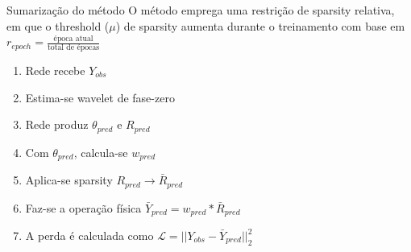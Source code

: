 \begin{frame}{Sumarização do método}
    O método emprega uma restrição de sparsity relativa, 
    em que o threshold ($\mu$) de sparsity aumenta durante o treinamento
    com base em $r_{epoch} = \frac{\text{época atual}}{\text{total de épocas}}$
    
    \begin{enumerate}
        \item Rede recebe $Y_{obs}$
        \item Estima-se wavelet de fase-zero
        \item Rede produz $\theta_{pred}$ e $R_{pred}$ 
        \item Com $\theta_{pred}$, calcula-se $w_{pred}$
        \item Aplica-se sparsity $R_{pred} \rightarrow \bar{R}_{pred}$
        \item Faz-se a operação física $\bar{Y}_{pred} = w_{pred} * \bar{R}_{pred}$
        \item A perda é calculada como $\mathcal{L} = || Y_{obs} - \bar{Y}_{pred} ||_2^2$
    \end{enumerate}
\end{frame}